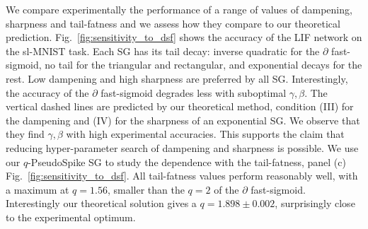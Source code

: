 We compare experimentally the performance of a range of values of dampening, sharpness and tail-fatness and we assess how they compare to our theoretical prediction. Fig.~\ref{fig:sensitivity_to_dsf} shows the accuracy of the LIF network on the sl-MNIST task. Each SG has its tail decay: inverse quadratic for the $\partial$ fast-sigmoid, no tail for the triangular and rectangular, and exponential decays for the rest. Low dampening and high sharpness are preferred by all SG. Interestingly, the accuracy of the $\partial$ fast-sigmoid degrades less with suboptimal $\gamma,\beta$. The vertical dashed lines are predicted by our theoretical method, condition (III) for the dampening and (IV) for the sharpness of an exponential SG. We observe that they find $\gamma,\beta$ with high experimental accuracies. This supports the claim that reducing hyper-parameter search of dampening and sharpness is possible. We use our $q$-PseudoSpike SG to study the dependence with the tail-fatness, panel (c) Fig.~\ref{fig:sensitivity_to_dsf}. All tail-fatness values perform reasonably well, with a maximum at $q=1.56$, smaller than the $q=2$ of the $\partial$ fast-sigmoid. Interestingly our theoretical solution gives a $q=1.898 \pm 0.002$, surprisingly close to the experimental optimum.

